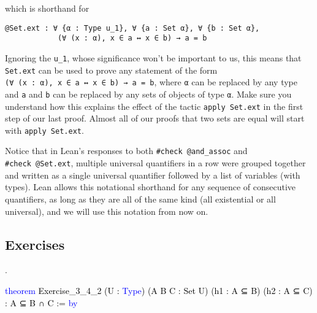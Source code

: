 \documentclass[
  letterpaper,
  DIV=11,
  numbers=noendperiod]{scrreprt}
\makeatletter
\newenvironment{Shaded}{\begin{snugshade}}{\end{snugshade}}
\newcommand{\KeywordTok}[1]{\textcolor[rgb]{0.00,0.23,0.31}{#1}}
\newcommand{\NormalTok}[1]{\textcolor[rgb]{0.00,0.23,0.31}{#1}}
\newcommand{\SpecialCharTok}[1]{\textcolor[rgb]{0.37,0.37,0.37}{#1}}
\newcommand{\WarningTok}[1]{\textcolor[rgb]{0.37,0.37,0.37}{\textit{#1}}}
\def\redsquiggly{\bgroup \markoverwith{\textcolor{red}{\lower3.5\p@\hbox{\sixly \char58}}}\ULon}
\renewcommand{\NormalTok}[1]{\textcolor[HTML]{000000}{#1}}
\renewcommand{\KeywordTok}[1]{\textcolor[HTML]{0000FF}{#1}}
\renewcommand{\SpecialCharTok}[1]{}
\renewcommand{\WarningTok}[1]{\redsquiggly{\textcolor[HTML]{0000FF}{#1}}}
\newenvironment{ind}
	{\begin{list}{}{\setlength{\leftmargin}{1em}}\item\relax}
	{\end{list}}
\newcommand{\nobreakShaded}{\renewenvironment{Shaded}
	{\begin{tcolorbox}[frame hidden, enhanced, interior hidden, boxrule=0pt,
		borderline west={3pt}{0pt}{shadecolor}, sharp corners]}
	{\end{tcolorbox}}}
\newenvironment{numex}[1]
	{\begin{minipage}[t]{0.04\textwidth}\vspace{8pt}{#1}.
		\end{minipage}\nobreakShaded\begin{minipage}[t]{0.96\textwidth}\vspace{0pt}}
	{\end{minipage}}
\theoremstyle{remark}
\makeatother
\begin{document}
which is shorthand for

\begin{ind}

\begin{verbatim}
@Set.ext : ∀ {α : Type u_1}, ∀ {a : Set α}, ∀ {b : Set α},
            (∀ (x : α), x ∈ a ↔ x ∈ b) → a = b
\end{verbatim}

\end{ind}

Ignoring the \texttt{u\_1}, whose significance won't be important to us,
this means that \texttt{Set.ext} can be used to prove any statement of
the form \texttt{(∀\ (x\ :\ α),\ x\ ∈\ a\ ↔\ x\ ∈\ b)\ →\ a\ =\ b},
where \texttt{α} can be replaced by any type and \texttt{a} and
\texttt{b} can be replaced by any sets of objects of type \texttt{α}.
Make sure you understand how this explains the effect of the tactic
\texttt{apply\ Set.ext} in the first step of our last proof. Almost all
of our proofs that two sets are equal will start with
\texttt{apply\ Set.ext}.

Notice that in Lean's responses to both \texttt{\#check\ @and\_assoc}
and \texttt{\#check\ @Set.ext}, multiple universal quantifiers in a row
were grouped together and written as a single universal quantifier
followed by a list of variables (with types). Lean allows this
notational shorthand for any sequence of consecutive quantifiers, as
long as they are all of the same kind (all existential or all
universal), and we will use this notation from now on.

\hypertarget{exercises-2}{%
\subsection{Exercises}\label{exercises-2}}

\begin{numex}{1}

\begin{Shaded}
\begin{Highlighting}[]
\KeywordTok{theorem}\NormalTok{ Exercise\_3\_4\_2 (U : }\KeywordTok{Type}\NormalTok{) (A B C : Set U)}
\NormalTok{    (h1 : A ⊆ B) (h2 : A ⊆ C) : A ⊆ B ∩ C := }\KeywordTok{by}
  
  \SpecialCharTok{**}\WarningTok{done}\SpecialCharTok{::}
\end{Highlighting}
\end{Shaded}

\end{numex}
\end{document}
